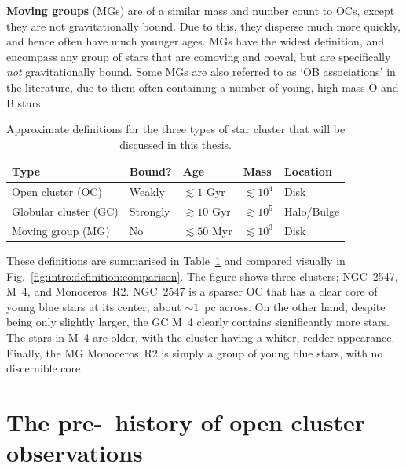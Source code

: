\textbf{Moving groups} (MGs) are of a similar mass and number count to OCs, except they are not gravitationally bound. Due to this, they disperse much more quickly, and hence often have much younger ages. MGs have the widest definition, and encompass any group of stars that are comoving and coeval, but are specifically \emph{not} gravitationally bound. Some MGs are also referred to as `OB associations' in the literature, due to them often containing a number of young, high mass O and B stars. 

\begin{table}[tb]
	\begin{tabularx}{\textwidth}{l | X | X | X | X}
		\hline\hline
		Type & Bound? & Age & Mass & Location \\
		\hline
		Open cluster (OC)   & Weakly & $\lesssim 1$ Gyr & $\lesssim 10^4$ \MSun & Disk \\
		Globular cluster (GC)   & Strongly & $\gtrsim 10$ Gyr & $\gtrsim 10^5$ \MSun & Halo/Bulge \\
		Moving group (MG)   & No & $\lesssim 50$ Myr & $\lesssim 10^3$ \MSun & Disk\\
		\hline
	\end{tabularx}
	\caption{Approximate definitions for the three types of star cluster that will be discussed in this thesis.\label{tab:intro:definition:definition}}
\end{table}

These definitions are summarised in Table~\ref{tab:intro:definition:definition} and compared visually in Fig.~\ref{fig:intro:definition:comparison}. The figure shows three clusters; NGC~2547, M~4, and Monoceros~R2. NGC~2547 is a sparser OC that has a clear core of young blue stars at its center, about $\sim 1$~pc across. On the other hand, despite being only slightly larger, the GC M~4 clearly contains significantly more stars. The stars in M~4 are older, with the cluster having a whiter, redder appearance. Finally, the MG Monoceros~R2 is simply a group of young blue stars, with no discernible core. 





\section{The pre-\gaia\ history of open cluster observations}
\label{sec:intro:pre-gaia}

